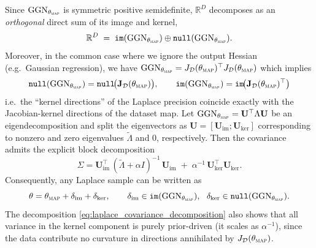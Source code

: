 Since $\mathrm{GGN}_{\theta_{\textsc{map}}}$ is symmetric positive semidefinite, $\mathbb R^D$ decomposes as an
\emph{orthogonal} direct sum of its image and kernel,
\begin{equation}
\mathbb R^D \;=\; \texttt{im}(\mathrm{GGN}_{\theta_{\textsc{map}}}) \oplus \texttt{null}(\mathrm{GGN}_{\theta_{\textsc{map}}}).
\label{eq:ggn_image_kernel_split}
\end{equation}
Moreover, in the common case where we ignore the output Hessian (e.g.\ Gaussian regression), we have $\mathrm{GGN}_{\theta_{\textsc{map}}}=J_{\mathcal D}(\theta_{\textsc{map}})^\top J_{\mathcal D}(\theta_{\textsc{map}})$ which implies
\begin{align}
\texttt{null}(\mathrm{GGN}_{\theta_{\textsc{map}}})=\texttt{null}\!\big(\mathbf{J}_{\mathcal D}(\theta_{\textsc{map}})\big),\qquad \texttt{im}(\mathrm{GGN}_{\theta_{\textsc{map}}})=\texttt{im}\!\big(\mathbf{J}_{\mathcal D}(\theta_{\textsc{map}})^\top\big)
\end{align}
i.e.\ the ``kernel directions'' of the Laplace precision coincide exactly with the Jacobian-kernel
directions of the dataset map.
Let $\mathrm{GGN}_{\theta_{\textsc{map}}}=\mathbf{U}^\top \Lambda \mathbf{U}$ be an eigendecomposition and split the eigenvectors as
$\mathbf{U}=[\mathbf{U}_{\mathrm{im}};\mathbf{U}_{\mathrm{ker}}]$ corresponding to nonzero and zero eigenvalues
$\tilde\Lambda$ and $0$, respectively. Then the covariance admits the explicit block decomposition
\begin{equation}
\Sigma
= \mathbf{U}_{\mathrm{im}}^\top\,(\tilde\Lambda+\alpha I)^{-1}\,\mathbf{U}_{\mathrm{im}}
\;+\;
\alpha^{-1}\,\mathbf{U}_{\mathrm{ker}}^\top \mathbf{U}_{\mathrm{ker}}.
\label{eq:laplace_covariance_decomposition}
\end{equation}
Consequently, any Laplace sample can be written as
\[
\theta = \theta_{\textsc{map}} + \delta_{\mathrm{im}} + \delta_{\mathrm{ker}},
\qquad
\delta_{\mathrm{im}}\in\texttt{im}(\mathrm{GGN}_{\theta_{\textsc{map}}}),\ \ 
\delta_{\mathrm{ker}}\in\texttt{null}(\mathrm{GGN}_{\theta_{\textsc{map}}}).
\]
The decomposition \eqref{eq:laplace_covariance_decomposition} also shows that all variance in the
kernel component is purely prior-driven (it scales as $\alpha^{-1}$), since the data contribute no
curvature in directions annihilated by $J_{\mathcal D}(\theta_{\textsc{map}})$.

